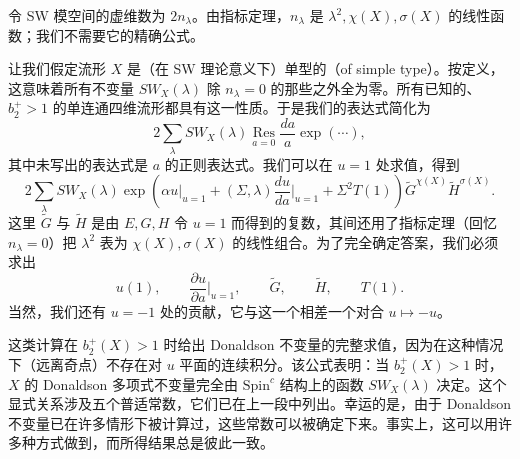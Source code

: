令 SW 模空间的虚维数为 $2n_\lambda$。由指标定理，$n_\lambda$ 是 $\lambda^2,\chi(X),\sigma(X)$ 的线性函数；我们不需要它的精确公式。


让我们假定流形 $X$ 是（在 SW 理论意义下）单型的（of simple type）。按定义，这意味着所有不变量 $SW_X(\lambda)$ 除 $n_\lambda=0$ 的那些之外全为零。所有已知的、$b_2^+>1$ 的单连通四维流形都具有这一性质。于是我们的表达式简化为
\[
2\sum_\lambda SW_X(\lambda)\operatorname*{Res}_{a=0}\frac{da}{a}\exp(\cdots),
\]
其中未写出的表达式是 $a$ 的正则表达式。我们可以在 $u=1$ 处求值，得到
\[
2\sum_\lambda SW_X(\lambda)\exp\left(\alpha u\big|_{u=1}+(\Sigma,\lambda)\frac{du}{da}\Big|_{u=1}+\Sigma^2T(1)\right)
\tilde G^{\chi(X)}\tilde H^{\sigma(X)}.
\]
这里 $\tilde G$ 与 $\tilde H$ 是由 $E,G,H$ 令 $u=1$ 而得到的复数，其间还用了指标定理（回忆 $n_\lambda=0$）把 $\lambda^2$ 表为 $\chi(X),\sigma(X)$ 的线性组合。为了完全确定答案，我们必须求出
\[
u(1),\qquad\frac{\partial u}{\partial a}\Big|_{u=1},\qquad\tilde G,\qquad\tilde H,\qquad T(1).
\]
当然，我们还有 $u=-1$ 处的贡献，它与这一个相差一个对合 $u\mapsto-u$。

这类计算在 $b_2^+(X)>1$ 时给出 Donaldson 不变量的完整求值，因为在这种情况下（远离奇点）不存在对 $u$ 平面的连续积分。该公式表明：当 $b_2^+(X)>1$ 时，$X$ 的 Donaldson 多项式不变量完全由 $\mathrm{Spin}^c$ 结构上的函数 $SW_X(\lambda)$ 决定。这个显式关系涉及五个普适常数，它们已在上一段中列出。幸运的是，由于 Donaldson 不变量已在许多情形下被计算过，这些常数可以被确定下来。事实上，这可以用许多种方式做到，而所得结果总是彼此一致。


